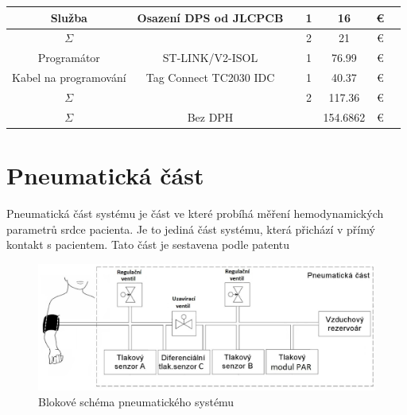 \begin{table}[H]
\begin{ctucolortab}
\begin{tabular}{ccccccc}
            Služba                & Osazení DPS od JLCPCB  &               & 1     & 16       & €        & \\
            \bottomrule
            $\Sigma$              &                        &               & 2     & 21       & €        & \\
            \bottomrule
            Programátor           & ST-LINK/V2-ISOL        &               & 1     & 76.99    & €        & \\
            Kabel na programování & Tag Connect TC2030 IDC &               & 1     & 40.37    & €        & \\
            \bottomrule
            $\Sigma$              &                        &               & 2     & 117.36   & €        & \\
            \bottomrule
            \bottomrule
            $\Sigma$              & Bez DPH                &               &       & 154.6862 & €        & \\
            \bottomrule
        \end{tabular}
    \end{ctucolortab}
\end{table}
\section{Pneumatická část}
Pneumatická část systému je část ve které probíhá měření hemodynamických parametrů srdce pacienta. Je to jediná část systému, která přichází v přímý kontakt s pacientem. Tato část je sestavena podle
patentu \cite[US Patent US10251567]{cite:2}
\begin{figure}[H]
    \includegraphics[width=1\linewidth]{pictures/blokove_schema_pneu.jpg}
    \caption{Blokové schéma pneumatického systému}
    \label{fig:pneu_block}
\end{figure}

